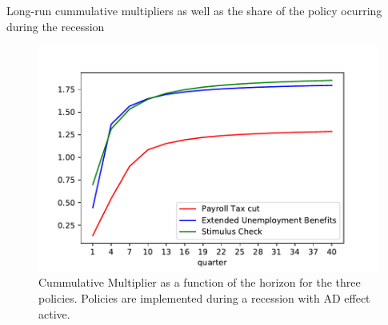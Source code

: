 \documentclass[../HAFiscal]{subfiles}
\begin{document}
\begin{table}[h]
	\center
	
	\caption{Long-run cummulative multipliers as well as the share of the policy ocurring during the recession}
	\label{tab:Multiplier}
\end{table}

\begin{figure}
	\centering
	\includegraphics[width=0.8\linewidth]{Code/HA-Models/FromPandemicCode/Figures/Cummulative_multipliers}
	\caption{Cummulative Multiplier as a function of the horizon for the three policies. Policies are implemented during a recession with AD effect active.}
	\label{fig:cummulativemultipliers}
\end{figure}
\end{document}
